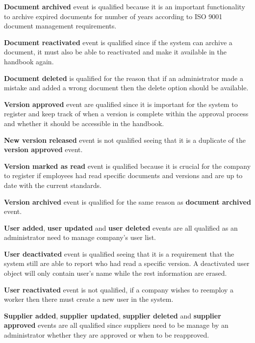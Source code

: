 \textbf{Document archived} event is qualified because it is an important functionality to archive expired documents for number of years according to ISO 9001 document management requirements. 

\textbf{Document reactivated} event is qualified since if the system can archive a document, it must also be able to reactivated and make it available in the handbook again. 

\textbf{Document deleted} is qualified for the reason that if an administrator made a mistake and added a wrong document then the delete option should be available. 

\textbf{Version approved} event are qualified since it is important for the system to register and keep track of when a version is complete within the approval process and whether it should be accessible in the handbook. 

\textbf{New version released} event is not qualified seeing that it is a duplicate of the \textbf{version approved} event. 

\textbf{Version marked as read} event is qualified because it is crucial for the company to register if employees had read specific documents and versions and are up to date with the current standards. 

\textbf{Version archived} event is qualified for the same reason as \textbf{document archived} event.

\textbf{User added}, \textbf{user updated} and \textbf{user deleted} events are all qualified as an administrator need to manage company's user list. 

\textbf{User deactivated} event is qualified seeing that it is a requirement that the system still are able to report who had read a specific version. A deactivated user object will only contain user's name while the rest information are erased.

\textbf{User reactivated} event is not qualified, if a company wishes to reemploy a worker then there must create a new user in the system. 


\textbf{Supplier added}, \textbf{supplier updated},  \textbf{supplier deleted} and \textbf{supplier approved} events are all qualified since suppliers need to be manage by an administrator whether they are approved or when to be reapproved. 

